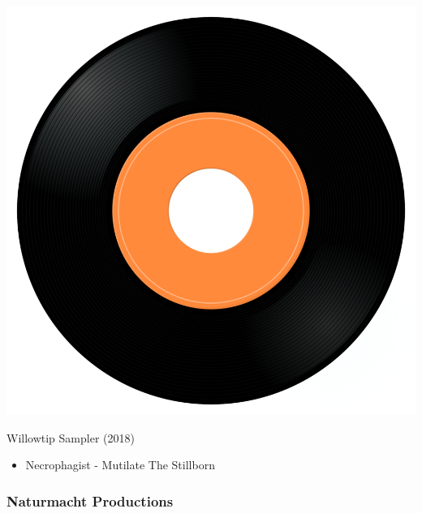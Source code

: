 \begin{minipage}[t]{0.25\textwidth}\vspace{0pt}
\captionsetup{type=figure}
\includegraphics[width=\textwidth]{Images/cover.png}
\caption*{Willowtip Sampler (2018)}
\end{minipage}
\begin{minipage}[t]{0.25\textwidth}\vspace{0pt}
\begin{itemize}[nosep,leftmargin=1em,labelwidth=*,align=left]
	\setlength{\itemsep}{0pt}
	\item Necrophagist - Mutilate The Stillborn
\end{itemize}
\end{minipage}

\subsubsection{Naturmacht Productions}

